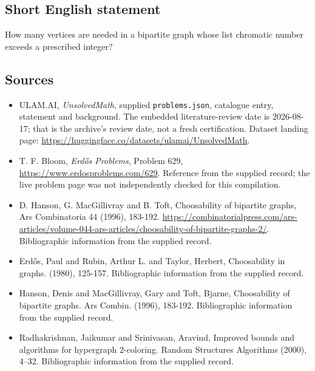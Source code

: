 \documentclass[11pt,a4paper]{article}
\begin{document}
\subsection{Short English statement}

How many vertices are needed in a bipartite graph whose list chromatic number exceeds a prescribed integer?

\subsection{Sources}

{\small

\begin{itemize}

\item[\hypertarget{source:statement:1}{S1}] ULAM.AI, \emph{UnsolvedMath}, supplied \texttt{problems.json}, catalogue entry, statement and background. The embedded literature-review date is 2026-08-17; that is the archive’s review date, not a fresh certification. Dataset landing page: \url{https://huggingface.co/datasets/ulamai/UnsolvedMath}.

\item[\hypertarget{source:statement:2}{S2}] T. F. Bloom, \emph{Erdős Problems}, Problem 629, \url{https://www.erdosproblems.com/629}. Reference from the supplied record; the live problem page was not independently checked for this compilation.

\item[\hypertarget{source:statement:3}{S3}] D. Hanson, G. MacGillivray and B. Toft, Choosability of bipartite graphs, Ars Combinatoria 44 (1996), 183-192. \url{https://combinatorialpress.com/ars-articles/volume-044-ars-articles/choosability-of-bipartite-graphs-2/}. Bibliographic information from the supplied record.

\item[\hypertarget{source:statement:4}{S4}] Erd\H{o}s, Paul and Rubin, Arthur L. and Taylor, Herbert, Choosability in graphs. (1980), 125-157. Bibliographic information from the supplied record.

\item[\hypertarget{source:statement:5}{S5}] Hanson, Denis and MacGillivray, Gary and Toft, Bjarne, Choosability of bipartite graphs. Ars Combin. (1996), 183-192. Bibliographic information from the supplied record.

\item[\hypertarget{source:statement:6}{S6}] Radhakrishnan, Jaikumar and Srinivasan, Aravind, Improved bounds and algorithms for hypergraph {$2$}-coloring. Random Structures Algorithms (2000), 4--32. Bibliographic information from the supplied record.

\end{itemize}

}

\label{end:statement}
\end{document}
